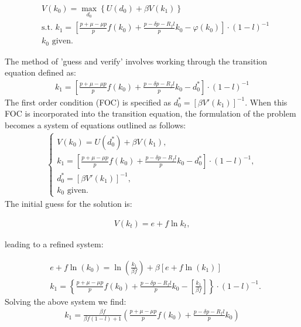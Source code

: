 \documentclass[12pt]{report}
\begin{document}
 \begin{align}
     & V(k_0) = \max_{d_0} \left\{U(d_0) + \beta V(k_1)\right\} \\
     & \text{s.t. } k_1 = \left[ \frac{p + \mu - \mu p}{p}f(k_{0}) + \frac{p - \delta p - R_f l}{p} k_{0}  - \varphi(k_{0}) \right] \cdot \left(1-l\right)^{-1} \nonumber  \\
     & k_0 \text{ given.} \nonumber
 \end{align}

 The method of 'guess and verify' involves working through the
 transition equation defined as:
 \begin{align*}
     k_1 = \left[ \frac{p + \mu - \mu p}{p}f(k_{0}) + \frac{p - \delta p - R_f l}{p} k_{0}  - d^*_0 \right] \cdot \left(1-l\right)^{-1}
 \end{align*}
The first order condition (FOC) is specified as \(d^*_0 = [\beta V'(k_{1})]^{-1}\). When this
 FOC is incorporated into the transition equation, the formulation of the problem becomes a system of equations outlined
 as follows:
 \begin{align*}
     \begin{cases}
         V(k_0) = U(d_0^*) + \beta V(k_1), \\
         k_1 = \left[ \frac{p + \mu - \mu p}{p}f(k_{0}) + \frac{p - \delta p - R_f l}{p} k_{0}  - d^*_0 \right] \cdot \left(1-l\right)^{-1}, \\
         d^*_0 = [\beta V'(k_{1})]^{-1},\\
         k_0 \text{ given.}
     \end{cases}
 \end{align*}
The initial guess for the solution is:

 \begin{align*}
     V(k_t) = e + f \ln{k_t},
 \end{align*}


leading to a refined system:


 \begin{align}
    &e + f \ln(k_0) = \ln\left( \frac{k_1}{\beta f} \right) + \beta \left[ e + f \ln(k_1) \right] \label{eq28}\\
    &k_1 = \left\{ \frac{p + \mu - \mu p}{p}f(k_{0}) + \frac{p - \delta p - R_f l}{p} k_{0} - \left[ \frac{k_1}{\beta f} \right] \right\} \cdot \left(1-l\right)^{-1}. \nonumber
\end{align}
Solving the above system we find:
\begin{align}
    k_1 = \frac{\beta f}{\beta f (1-l) + 1} \left( \frac{p + \mu - \mu p}{p}f(k_{0}) + \frac{p - \delta p - R_f l}{p} k_{0} \right)
\end{align}
\end{document}
